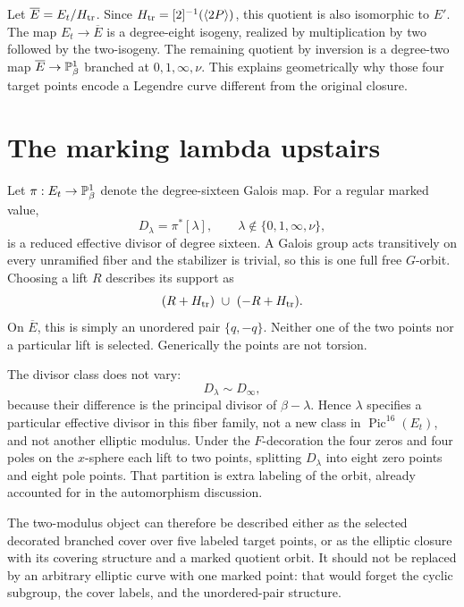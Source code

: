 Let \(\overline E=E_t/H_{\rm tr}\). Since
\(H_{\rm tr}=[2]^{-1}(\langle2P\rangle)\), this quotient is also isomorphic to \(E'\). The map \(E_t\to\overline E\) is a degree-eight isogeny, realized by multiplication by two followed by the two-isogeny. The remaining quotient by inversion is a degree-two map \(\overline E\to\mathbb P^1_\beta\) branched at \(0,1,\infty,\nu\). This explains geometrically why those four target points encode a Legendre curve different from the original closure.

\section{The marking lambda upstairs}\label{sec:divisor}

Let \(\pi:E_t\to\mathbb P^1_\beta\) denote the degree-sixteen Galois map. For a regular marked value,
\begin{equation}\label{eq:Dlambda}
D_\lambda=\pi^*[\lambda],\qquad \lambda\notin\{0,1,\infty,\nu\},
\end{equation}
is a reduced effective divisor of degree sixteen. A Galois group acts transitively on every unramified fiber and the stabilizer is trivial, so this is one full free \(G\)-orbit. Choosing a lift \(R\) describes its support as
\begin{equation}\label{eq:orbitdivisor}
(R+H_{\rm tr})\ \cup\ (-R+H_{\rm tr}).
\end{equation}
On \(\overline E\), this is simply an unordered pair \(\{q,-q\}\). Neither one of the two points nor a particular lift is selected. Generically the points are not torsion.

The divisor class does not vary:
\[
D_\lambda\sim D_\infty,
\]
because their difference is the principal divisor of \(\beta-\lambda\). Hence \(\lambda\) specifies a particular effective divisor in this fiber family, not a new class in \(\operatorname{Pic}^{16}(E_t)\), and not another elliptic modulus. Under the \(F\)-decoration the four zeros and four poles on the \(x\)-sphere each lift to two points, splitting \(D_\lambda\) into eight zero points and eight pole points. That partition is extra labeling of the orbit, already accounted for in the automorphism discussion.

The two-modulus object can therefore be described either as the selected decorated branched cover over five labeled target points, or as the elliptic closure with its covering structure and a marked quotient orbit. It should not be replaced by an arbitrary elliptic curve with one marked point: that would forget the cyclic subgroup, the cover labels, and the unordered-pair structure.

